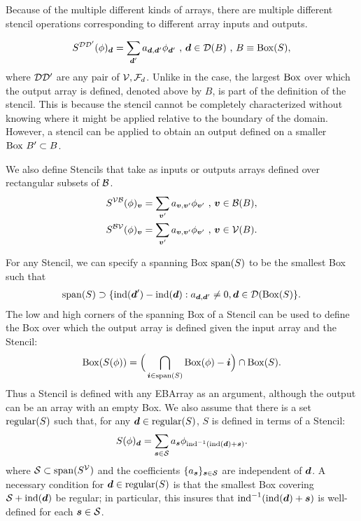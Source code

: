\documentclass[12pt]{article}
\newcommand{\ind}{{\rm{ind}}}
\newcommand{\regular}{{\rm{regular}}}
\newcommand{\spanEB}{{\rm{span}}}
\newcommand{\vof}{{\mbf{v}}}
\newcommand{\dgen}{{\mbf{d}}}
\begin{document}
Because of the multiple different kinds of arrays, there are multiple different stencil operations corresponding to different array inputs and outputs. 

\begin{gather*}
S^{\mcl{D}\mcl{D'}}(\phi)_\dgen = \sum \limits_{\dgen'} a_{\dgen,\dgen'} \phi_{\dgen'} \cma \dgen \in \mcl{D}(B) \cma
B \equiv {\rm Box}(S),
\end{gather*}
where ${\mathcal{D}}{\mathcal{D}}'$ are any pair of ${\mathcal{V}}, {\mathcal{F}}_d$. Unlike in the  case, the largest ${\rm Box}$ over which the output array is defined, denoted above by $B$, is part of the definition of the stencil. This is because the stencil cannot be completely characterized without knowing where it might be applied relative to the boundary of the domain. However, a stencil can be applied to obtain an output defined on a smaller ${\rm Box} ~ B' \subset B$. 

We also define Stencils that take as inputs or outputs arrays defined over rectangular subsets of ${\mathcal{B}}$.
\begin{gather*}
S^{\mcl{V}\mcl{B}}(\phi)_\vof = \sum \limits_{\vof '} a_{\vof,\vof'} \phi_{\vof'} \cma \vof \in \mcl{B}(B),  \\
S^{\mcl{B}\mcl{V}}(\phi)_\vof = \sum \limits_{\vof '} a_{\vof,\vof'} \phi_{\vof'} \cma \vof \in \mcl{V}(B) .
\end{gather*}

\noindent
For any Stencil, we can specify a spanning Box $\spanEB(S)$ to be the smallest Box such that 
\begin{gather*}
\spanEB(S) \supset \{\ind(\dgen') - \ind(\dgen):a_{\dgen,\dgen'} \neq 0, \dgen \in \mcl{D}(\MBox(S)\}.
\end{gather*}
The low and high corners of the spanning Box of a Stencil can be used to define the Box over which the output array is defined given the input array and the Stencil: 
\begin{gather*}
\MBox(S(\phi)) = \Big(\bigcap \limits_{\mbf{i} \in \spanEB(S)} \MBox(\phi) - \mbf{i} \Big) \cap \MBox(S).
\end{gather*}
Thus a Stencil is defined with any EBArray as an argument, although the output can be an array with an empty Box. 
We also assume that there is a set $\regular(S)$ such that, for any $\dgen \in \regular(S)$,  $S$ is defined in terms of a  Stencil: 
\begin{gather*}
S (\phi)_\dgen = \sum \limits_{\mbf{s} \in \mcl{S}} a_{\mbf{s}} \phi_{\ind^{-1}(\ind(\dgen) + \mbf{s})}.
\end{gather*}
where $\mcl{S} \subset \spanEB(S^\mcl{V})$ and the coefficients $\{a_{\boldsymbol{s}}\}_{{\boldsymbol{s}} \in {\mathcal{S}}}$ are independent of $\dgen$. A necessary condition for $\dgen \in \regular(S)$ is that the smallest Box covering $\mcl{S} + \ind(\dgen)$ be regular; in particular, this insures that $\ind^{-1}(\ind(\dgen) + \mbf{s})$ is well-defined for each ${\boldsymbol{s}} \in {\mathcal{S}}$. 
\end{document}
